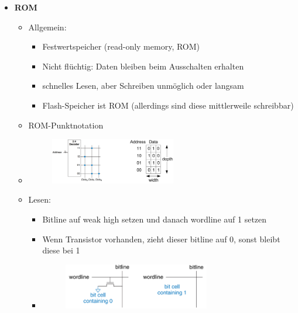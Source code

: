 \documentclass[11pt,a4paper]{article}
\begin{document}
\begin{itemize}
\item \textbf{ROM}
	\begin{itemize}
	\item Allgemein:
		\begin{itemize}
		\item Festwertspeicher (read-only memory, ROM)
		\item Nicht flüchtig: Daten bleiben beim Ausschalten erhalten
		\item schnelles Lesen, aber Schreiben unmöglich oder langsam
		\item Flash-Speicher ist ROM (allerdings sind diese mittlerweile schreibbar)
		\end{itemize}
	\item ROM-Punktnotation
	\item[]
			\begin{figure}[H]
			\begin{center}
			\includegraphics[height=2cm]{Bilder/rompunkt}
			\end{center}
			\end{figure}
	\item Lesen:
		\begin{itemize}
		\item Bitline auf weak high setzen und danach wordline auf 1 setzen
		\item Wenn Transistor vorhanden, zieht dieser bitline auf 0, sonst bleibt diese bei 1
		\item[]
			\begin{figure}[H]
			\begin{center}
			\includegraphics[height=2cm]{Bilder/romread}
			\end{center}
			\end{figure}
		\end{itemize}
		
\pagebreak		
		

\end{itemize}
\end{itemize}
\end{document}
